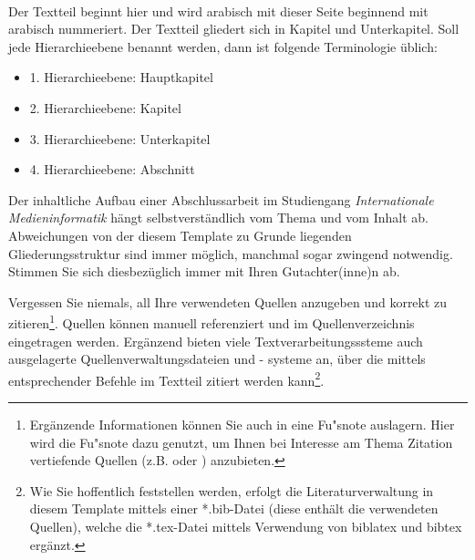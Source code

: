 \\
\linebreak[4]
\linebreak[4]
Der Textteil beginnt hier und wird arabisch mit dieser Seite beginnend mit \flqq{} arabisch nummeriert. Der Textteil gliedert sich in Kapitel und Unterkapitel. Soll jede Hierarchieebene benannt werden, dann ist folgende Terminologie  \"ublich:

\begin{itemize}
    \item 1. Hierarchieebene: Hauptkapitel
    \item 2. Hierarchieebene: Kapitel
    \item 3. Hierarchieebene: Unterkapitel
    \item 4. Hierarchieebene: Abschnitt
\end{itemize}

Der inhaltliche Aufbau einer Abschlussarbeit im Studiengang
\textit{Internationale Medieninformatik} h\"angt selbstverst\"andlich vom Thema und vom Inhalt ab. Abweichungen von der diesem Template zu Grunde liegenden Gliederungsstruktur sind immer m\"oglich, manchmal sogar zwingend notwendig. Stimmen Sie sich diesbez\"uglich immer mit Ihren Gutachter(inne)n ab.


Vergessen Sie niemals, all Ihre verwendeten Quellen anzugeben und korrekt zu zitieren\footnote{Erg\"anzende Informationen k\"onnen Sie auch in eine Fu"snote auslagern. Hier wird die Fu"snote dazu genutzt, um Ihnen bei Interesse am Thema Zitation vertiefende Quellen (z.B. \autocite{balzert2011} oder \autocite{franck2013}) anzubieten.}. Quellen k\"onnen manuell referenziert und im Quellenverzeichnis eingetragen werden. Erg\"anzend bieten viele Textverarbeitungsssteme auch ausgelagerte Quellenverwaltungsdateien und - systeme an,  \"uber die mittels entsprechender Befehle im Textteil zitiert werden kann\footnote{Wie Sie hoffentlich feststellen werden, erfolgt die Literaturverwaltung in diesem Template mittels einer *.bib-Datei (diese enth\"alt die verwendeten Quellen), welche die *.tex-Datei mittels Verwendung von biblatex und bibtex erg\"anzt.}.

